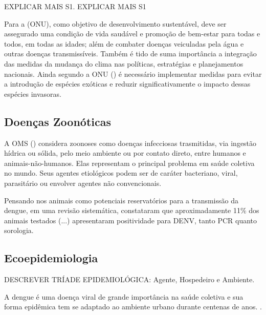 \indent EXPLICAR MAIS S1. EXPLICAR MAIS S1



\indent Para a  (\acrshort{ONU}), como objetivo de desenvolvimento sustentável, deve ser assegurado uma condição de vida saudável e promoção de bem-estar para todas e todos, em todas as idades; além de combater doenças veiculadas pela água e outras doenças transmissíveis. Também é tido de suma importância a integração das medidas da mudança do clima nas políticas, estratégias e planejamentos nacionais. Ainda segundo a \acrshort{ONU} (\citeyear{ONUODS22}) é necessário implementar medidas para evitar a introdução de espécies exóticas e reduzir significativamente o impacto dessas espécies invasoras.

\subsection{Doenças Zoonóticas}

\indent A \acrshort{OMS} (\citeyear{WHO2020Zoonoses}) considera zoonoses como doenças infecciosas trasmitidas, via ingestão hídrica ou sólida, pelo meio ambiente ou por contato direto, entre humanos e animais-não-humanos. Elas representam o principal problema em saúde coletiva no mundo. Seus agentes etiológicos podem ser de caráter bacteriano, viral, parasitário ou envolver agentes não convencionais.

\indent Pensando nos animais como potenciais reservatórios para a transmissão da dengue,  em uma revisão sistemática, constataram que aproximadamente 11\% dos animais testados (...) apresentaram positividade para DENV, tanto PCR quanto sorologia.


\subsection{Ecoepidemiologia}

\indent DESCREVER TRÍADE EPIDEMIOLÓGICA: Agente, Hospedeiro e Ambiente.


\indent A dengue é uma doença viral de grande importância na saúde coletiva e sua forma epidêmica tem se adaptado ao ambiente urbano durante centenas de anos. \cite{ArboviralTransmission}.

